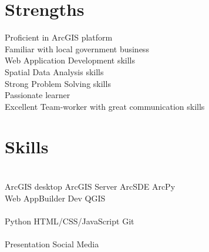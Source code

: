 \documentclass[]{deedy-resume-openfont}
\begin{document}
\begin{minipage}[t]{0.3\textwidth}
\section{Strengths}
\textbullet{} Proficient in ArcGIS platform \\
\textbullet{} Familiar with local government business \\
\textbullet{} Web Application Development skills \\
\textbullet{} Spatial Data Analysis skills \\
\textbullet{}Strong Problem Solving skills \\
\textbullet{}Passionate learner \\
\textbullet{} Excellent Team-worker with great communication skills \\
\sectionsep


\section{Skills}
 \\
ArcGIS desktop \textbullet{} ArcGIS Server \textbullet{} ArcSDE
\textbullet{} ArcPy\\  Web AppBuilder Dev \textbullet{} QGIS \\
  \\
Python \textbullet{} HTML/CSS/JavaScript \textbullet{} Git\\
 \\
Presentation \textbullet{} Social Media
\sectionsep




\end{minipage}
\end{document}
